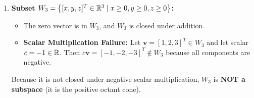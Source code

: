 \begin{enumerate}
    \item \textbf{Subset $W_3 = \left\{ [x, y, z]^T \in \mathbb{R}^3 \mid x \ge 0, y \ge 0, z \ge 0 \right\}$:}
    \begin{itemize}
        \item The zero vector is in $W_3$, and $W_3$ is closed under addition.
        \item \textbf{Scalar Multiplication Failure:} Let $\mathbf{v} = [1, 2, 3]^T \in W_3$ and let scalar $c = -1 \in \mathbb{R}$.
        Then $c\mathbf{v} = [-1, -2, -3]^T \notin W_3$ because all components are negative.
    \end{itemize}
    Because it is not closed under negative scalar multiplication, $W_3$ is \textbf{NOT a subspace} (it is the positive octant cone).
\end{enumerate}

